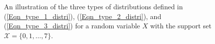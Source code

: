 \documentclass[10pt,journal]{IEEEtran}
\begin{document}
\begin{figure}[t]
\begin{center}
% 
\end{center}

\caption{An illustration of the three types of distributions defined in (\ref{Eqn_type_1_distri}), (\ref{Eqn_type_2_distri}),
and (\ref{Eqn_type_3_distri}) for a random variable $X$ with the support set $\mathcal{X}=\{0,1,\ldots,7\}$.}
% 
\label{Figure_example_distributions}
% 
\end{figure}
% 
% 
\end{document}
